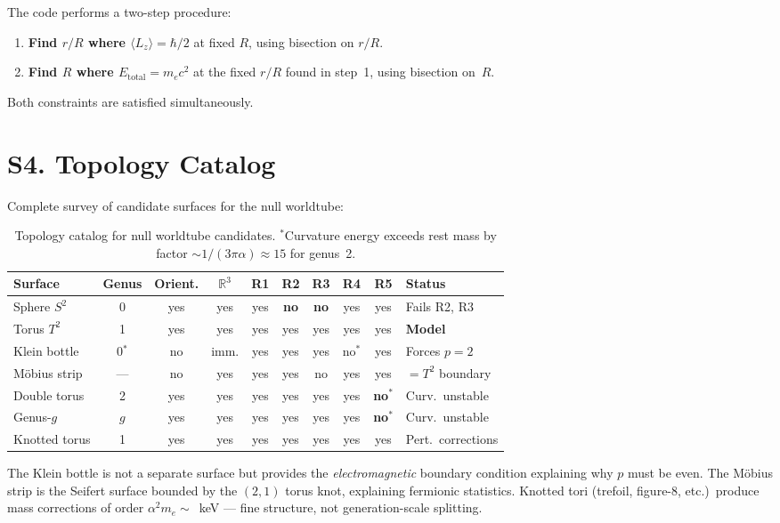 \documentclass[11pt,a4paper]{article}
\begin{document}
The code performs a two-step procedure:
\begin{enumerate}
  \item \textbf{Find $r/R$ where $\langle L_z \rangle = \hbar/2$} at fixed $R$, using bisection on $r/R$.
  \item \textbf{Find $R$ where $E_{\text{total}} = m_e c^2$} at the fixed $r/R$ found in step~1, using bisection on~$R$.
\end{enumerate}

Both constraints are satisfied simultaneously.

\section{S4. Topology Catalog}
\label{sec:S4}

Complete survey of candidate surfaces for the null worldtube:

\begin{table}[h]
\centering
\small
\begin{tabular}{@{}lccccccccl@{}}
\toprule
Surface & Genus & Orient. & $\mathbb{R}^3$ & R1 & R2 & R3 & R4 & R5 & Status \\
\midrule
Sphere $S^2$ & 0 & yes & yes & yes & \textbf{no} & \textbf{no} & yes & yes & Fails R2, R3 \\
Torus $T^2$ & 1 & yes & yes & yes & yes & yes & yes & yes & \textbf{Model} \\
Klein bottle & 0$^*$ & no & imm. & yes & yes & yes & no$^*$ & yes & Forces $p=2$ \\
M\"obius strip & --- & no & yes & yes & yes & no & yes & yes & $= T^2$ boundary \\
Double torus & 2 & yes & yes & yes & yes & yes & yes & \textbf{no}$^*$ & Curv.\ unstable \\
Genus-$g$ & $g$ & yes & yes & yes & yes & yes & yes & \textbf{no}$^*$ & Curv.\ unstable \\
Knotted torus & 1 & yes & yes & yes & yes & yes & yes & yes & Pert.\ corrections \\
\bottomrule
\end{tabular}
\caption{Topology catalog for null worldtube candidates. $^*$Curvature energy exceeds rest mass by factor $\sim 1/(3\pi\alpha) \approx 15$ for genus~2.}
\label{tab:topology}
\end{table}

The Klein bottle is not a separate surface but provides the \emph{electromagnetic} boundary condition explaining why $p$ must be even. The M\"obius strip is the Seifert surface bounded by the $(2,1)$ torus knot, explaining fermionic statistics. Knotted tori (trefoil, figure-8, etc.)\ produce mass corrections of order $\alpha^2 m_e \sim$~keV --- fine structure, not generation-scale splitting.
\end{document}
